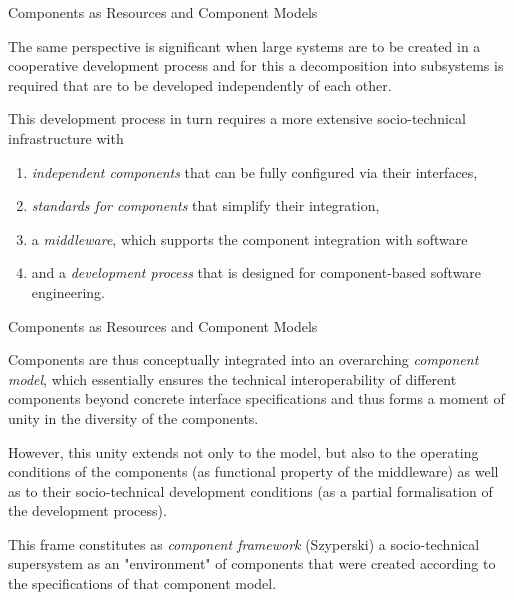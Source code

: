\documentclass{beamer}
\begin{document}
\begin{frame}{Components as Resources and Component Models}

The same perspective is significant when large systems are to be created in a
cooperative development process and for this a decomposition into subsystems
is required that are to be developed independently of each other.

This development process in turn requires a more extensive socio-technical
infrastructure with
\begin{enumerate}
\item \emph{independent components} that can be fully configured via their
  interfaces,
\item \emph{standards for components} that simplify their integration, 
\item a \emph{middleware}, which supports the component integration with
  software
\item and a \emph{development process} that is designed for component-based
  software engineering.
\end{enumerate}

\end{frame}

\begin{frame}{Components as Resources and Component Models}

Components are thus conceptually integrated into an overarching
\emph{component model}, which essentially ensures the technical
interoperability of different components beyond concrete interface
specifications and thus forms a moment of unity in the diversity of the
components.

However, this unity extends not only to the model, but also to the operating
conditions of the components (as functional property of the middleware) as
well as to their socio-technical development conditions (as a partial
formalisation of the development process).

This frame constitutes as \emph{component framework} (Szyperski) a
socio-technical supersystem as an "environment" of components that were
created according to the specifications of that component model.
  
\end{frame}
\end{document}
